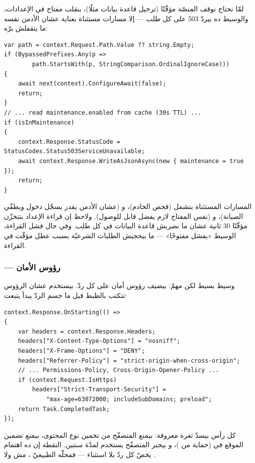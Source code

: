 لمّا نحتاج نوقف المنصّة مؤقّتًا (ترحيل قاعدة بيانات مثلًا)، بنقلب مفتاح  في الإعدادات، والوسيط ده بيردّ 503 على كل طلب — إلا مسارات مستثناة بعناية عشان الأدمن نفسه ما يتقفلش برّه:

\begin{english}
\begin{lstlisting}[language={[Sharp]C}]
var path = context.Request.Path.Value ?? string.Empty;
if (BypassedPrefixes.Any(p =>
        path.StartsWith(p, StringComparison.OrdinalIgnoreCase)))
{
    await next(context).ConfigureAwait(false);
    return;
}
// ... read maintenance.enabled from cache (30s TTL) ...
if (isInMaintenance)
{
    context.Response.StatusCode = StatusCodes.Status503ServiceUnavailable;
    await context.Response.WriteAsJsonAsync(new { maintenance = true });
    return;
}
\end{lstlisting}
\end{english}

المسارات المستثناة بتشمل  (فحص الخادم)، و (عشان الأدمن يقدر يسجّل دخول ويطفّي الصيانة)، و (نفس المفتاح لازم يفضل قابل للوصول). ولاحظ إن قراءة الإعداد بتتخزّن مؤقّتًا 30 ثانية عشان ما نضربش قاعدة البيانات في كل طلب. وفي حال فشل القراءة، الوسيط «يفشل مفتوحًا» — ما بيحجبش الطلبات الشرعيّة بسبب عطل مؤقّت في القراءة.

\subsubsection{ — رؤوس الأمان}

وسيط بسيط لكن مهمّ: بيضيف رؤوس أمان على كل ردّ. بيستخدم  عشان الرؤوس تتكتب بالظبط قبل ما جسم الردّ يبدأ يتبعت:

\begin{english}
\begin{lstlisting}[language={[Sharp]C}]
context.Response.OnStarting(() =>
{
    var headers = context.Response.Headers;
    headers["X-Content-Type-Options"] = "nosniff";
    headers["X-Frame-Options"] = "DENY";
    headers["Referrer-Policy"] = "strict-origin-when-cross-origin";
    // ... Permissions-Policy, Cross-Origin-Opener-Policy ...
    if (context.Request.IsHttps)
        headers["Strict-Transport-Security"] =
            "max-age=63072000; includeSubDomains; preload";
    return Task.CompletedTask;
});
\end{lstlisting}
\end{english}

كل رأس بيسدّ ثغرة معروفة:  بيمنع المتصفّح من تخمين نوع المحتوى،  بيمنع تضمين الموقع في  (حماية من )، و بيجبر المتصفّح يستخدم  لمدّة سنتين. النقطة إن ده اهتمام يخصّ كل ردّ بلا استثناء — فمحلّه الطبيعيّ ، مش  ولا .

